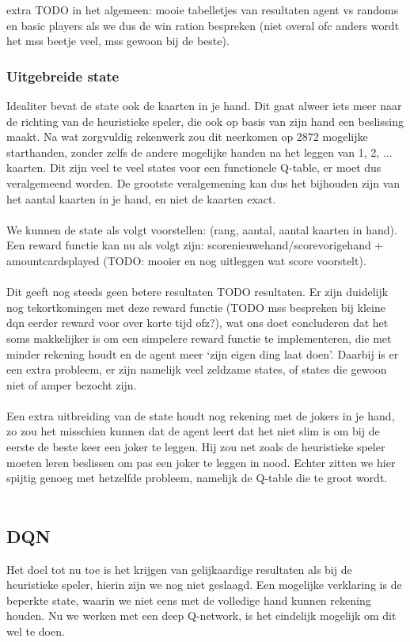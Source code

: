 \documentclass[11pt]{article}
\begin{document}
 extra TODO in het algemeen: mooie tabelletjes van resultaten agent vs randoms en basic players als we dus de win ration bespreken (niet overal ofc anders wordt het mss beetje veel, mss gewoon bij de beste).



\subsubsection{Uitgebreide state}
Idealiter bevat de state ook de kaarten in je hand. Dit gaat alweer iets meer naar de richting van de heuristieke speler, die ook op basis van zijn hand een beslissing maakt. Na wat zorgvuldig rekenwerk zou dit neerkomen op 2872 mogelijke starthanden, zonder zelfs de andere mogelijke handen na het leggen van 1, 2, ... kaarten. Dit zijn veel te veel states voor een functionele Q-table, er moet dus veralgemeend worden. De grootste veralgemening kan dus het bijhouden zijn van het aantal kaarten in je hand, en niet de kaarten exact.\\\\

We kunnen de state als volgt voorstellen: (rang, aantal, aantal kaarten in hand). Een reward functie kan nu als volgt zijn: scorenieuwehand/scorevorigehand + amountcardsplayed (TODO: mooier en nog uitleggen wat score voorstelt).\\\\
Dit geeft nog steeds geen betere resultaten TODO resultaten. Er zijn duidelijk nog tekortkomingen met deze reward functie (TODO mss bespreken bij kleine dqn \- eerder reward voor over korte tijd ofz?), wat ons doet concluderen dat het soms makkelijker is om een simpelere reward functie te implementeren, die met minder rekening houdt en de agent meer `zijn eigen ding laat doen'. Daarbij is er een extra probleem, er zijn namelijk  veel zeldzame states, of states die gewoon niet of amper bezocht zijn. \\\\
Een extra uitbreiding van de state houdt nog rekening met de jokers in je hand, zo zou het misschien kunnen dat de agent leert dat het niet slim is om bij de eerste de beste keer een joker te leggen. Hij zou net zoals de heuristieke speler moeten leren beslissen om pas een joker te leggen in nood. Echter zitten we hier spijtig genoeg met hetzelfde probleem, namelijk de Q-table die te groot wordt.\\\\


\subsection{DQN}
Het doel tot nu toe is het krijgen van gelijkaardige resultaten als bij de heuristieke speler, hierin zijn we nog niet geslaagd. Een mogelijke verklaring is de beperkte state, waarin we niet eens met de volledige hand kunnen rekening houden. Nu we werken met een deep Q-network, is het eindelijk mogelijk om dit wel te doen.\\\\
\end{document}
